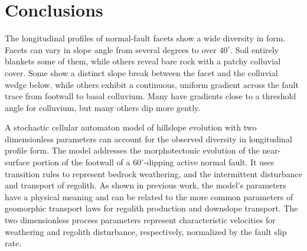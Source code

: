 




\section*{Conclusions}

The longitudinal profiles of normal-fault facets show a wide diversity in form. Facets can vary in slope angle from several degrees to over $40^\circ$. Soil entirely blankets some of them, while others reveal bare rock with a patchy colluvial cover. Some show a distinct slope break between the facet and the colluvial wedge below, while others exhibit a continuous, uniform gradient across the fault trace from footwall to basal colluvium. Many have gradients close to a threshold angle for colluvium, but many others dip more gently.

A stochastic cellular automaton model of hillslope evolution with two dimensionless parameters can account for the observed diversity in longitudinal profile form. The model addresses the morphotectonic evolution of the near-surface portion of the footwall of a $60^\circ$-dipping active normal fault. It uses transition rules to represent bedrock weathering,  and the intermittent disturbance and transport of regolith. As shown in previous work, the model's parameters have a physical meaning and can be related to the more common parameters of geomorphic transport laws for regolith production and downslope transport. The two dimensionless process parameters represent characteristic velocities for weathering and regolith disturbance, respectively, normalized by the fault slip rate.


